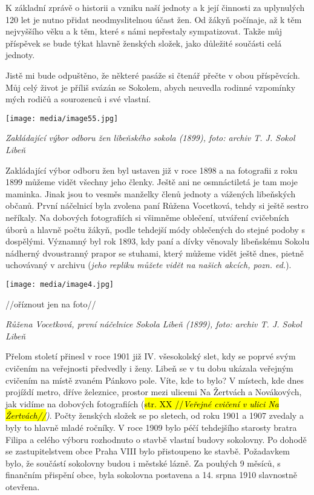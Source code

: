 K základní zprávě o historii a vzniku naší jednoty a k její činnosti za
uplynulých 120 let je nutno přidat neodmyslitelnou účast žen. Od žákyň
počínaje, až k těm nejvyššího věku a k těm, které s námi nepřestaly
sympatizovat. Takže můj příspěvek se bude týkat hlavně ženských složek,
jako důležité součásti celá jednoty.

Jistě mi bude odpuštěno, že některé pasáže si čtenář přečte v obou
příspěvcích. Můj celý život je příliš svázán se Sokolem, abych neuvedla
rodinné vzpomínky mých rodičů a sourozenců i své vlastní.

\texttt{[image: media/image55.jpg]}

\emph{Zakládající výbor odboru žen libeňského sokola (1899), foto:
archiv T. J. Sokol Libeň}

Zakládající výbor odboru žen byl ustaven již v roce 1898 a na fotografii
z roku 1899 můžeme vidět všechny jeho členky. Ještě ani ne osmnáctiletá
je tam moje maminka. Jinak jsou to vesměs manželky členů jednoty a
vážených libeňských občanů. První náčelnicí byla zvolena paní Růžena
Vocetková, tehdy si ještě sestro neříkaly. Na dobových fotografiích si
všimněme oblečení, utváření cvičebních úborů a hlavně počtu žákyň, podle
tehdejší módy oblečených do stejné podoby s dospělými. Významný byl rok
1893, kdy paní a dívky věnovaly libeňskému Sokolu nádherný dvoustranný
prapor se stuhami, který můžeme vidět ještě dnes, pietně uchovávaný v
archivu (\emph{jeho repliku můžete vidět na našich akcích, pozn. ed.}).

\texttt{[image: media/image4.jpg]}

//oříznout jen na foto//

\emph{Růžena Vocetková, první náčelnice Sokola Libeň (1899), foto:
archiv T. J. Sokol Libeň}

Přelom století přinesl v roce 1901 již IV. všesokolský slet, kdy se
poprvé svým cvičením na veřejnosti předvedly i ženy. Libeň se v tu dobu
ukázala veřejným cvičením na místě zvaném Pánkovo pole. Víte, kde to
bylo? V místech, kde dnes projíždí metro, dříve železnice, prostor mezi
ulicemi Na Žertvách a Novákových, jak vidíme na dobových fotografiích
(\hl{str. XX //\emph{Veřejné cvičení v ulici Na Žertvách//}}\emph{)}.
Počty ženských složek se po sletech, od roku 1901 a 1907 zvedaly a byly
to hlavně mladé ročníky. V roce 1909 bylo péčí tehdejšího starosty
bratra Filipa a celého výboru rozhodnuto o stavbě vlastní budovy
sokolovny. Po dohodě se zastupitelstvem obce Praha VIII bylo přistoupeno
ke stavbě. Požadavkem bylo, že součástí sokolovny budou i městské lázně.
Za pouhých 9 měsíců, s finančním přispění obce, byla sokolovna postavena
a 14. srpna 1910 slavnostně otevřena.

